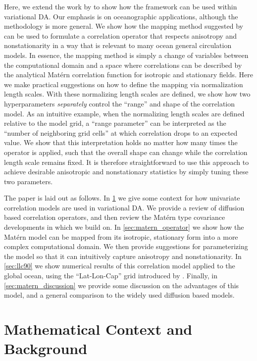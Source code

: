 \documentclass[alpha-refs]{wiley-article}
\begin{document}
Here, we extend the work by 
to show how the framework can be used within variational DA.
Our emphasis is on oceanographic applications, although the methodology is more
general.
We show how the mapping method suggested by 
can be used to formulate a correlation operator that respects anisotropy and
nonstationarity in a way that is relevant to many ocean general circulation
models.
In essence, the mapping method is simply a change of variables between the
computational domain and a space
where correlations can be described by the analytical Mat\'ern
correlation function for isotropic and stationary fields.
Here we make practical suggestions on how to define the mapping via normalization
length scales.
With these normalizing length scales are defined, we show how two
hyperparameters \textit{separately} control the ``range'' and shape of the
correlation model.
As an intuitive example, when the normalizing length scales are defined relative
to the model grid, a ``range parameter'' can be interpreted as the ``number of
neighboring grid cells'' at which correlation drops to an expected value.
We show that this interpretation holds no matter how many times the operator is
applied, such that the overall shape can change while the
correlation length scale remains fixed.
It is therefore straightforward to use this approach to achieve desirable
anisotropic and nonstationary statistics by simply tuning these two
parameters.

The paper is laid out as follows.
In \cref{sec:review} we give some context for how univariate correlation models
are used in variational DA.
We provide a review of diffusion based correlation operators, and
then review the Mat\'ern type covariance developments in 
which we build on.
In \cref{sec:matern_operator} we show how the Mat\'ern model can be mapped from
its isotropic, stationary form into a more complex computational domain.
We then provide suggestions for parameterizing the model so that it can
intuitively capture anisotropy and nonstationarity.
In \cref{sec:llc90} we show numerical results of this correlation model
applied to the global ocean, using the ``Lat-Lon-Cap'' grid introduced by
\citet{forgetECCOv4}.
Finally, in \cref{sec:matern_discussion} we provide some discussion on the
advantages of this model, and a general comparison to the widely used
diffusion based models.

\section{Mathematical Context and Background}
\label{sec:review}
\end{document}
